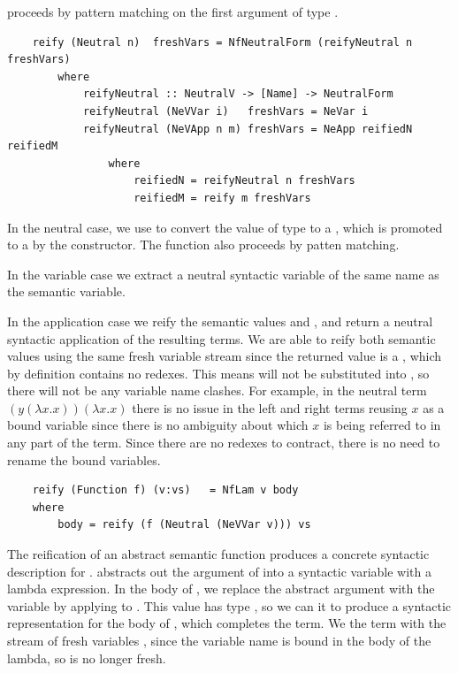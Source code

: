  proceeds by pattern matching on the first argument of type . 

\begin{lstlisting}
    reify (Neutral n)  freshVars = NfNeutralForm (reifyNeutral n freshVars)
        where
            reifyNeutral :: NeutralV -> [Name] -> NeutralForm
            reifyNeutral (NeVVar i)   freshVars = NeVar i
            reifyNeutral (NeVApp n m) freshVars = NeApp reifiedN reifiedM
                where
                    reifiedN = reifyNeutral n freshVars
                    reifiedM = reify m freshVars
\end{lstlisting}

In the neutral case, we use  to convert the value  of type  to a , which is promoted to a  by the  constructor. The  function also proceeds by patten matching. 

In the variable case we extract a neutral syntactic variable of the same name as the semantic variable. 

In the application case we reify the semantic values  and , and return a neutral syntactic application of the resulting terms.
We are able to reify both semantic values using the same fresh variable stream since the returned value is a , which by definition contains no redexes. This means  will not be substituted into , so there will not be any variable name clashes.
For example, in the neutral term $(y(\lambda x.x))(\lambda x . x)$ there is no issue in the left and right terms reusing $x$ as a bound variable since there is no ambiguity about which $x$ is being referred to in any part of the term. Since there are no redexes to contract, there is no need to rename the bound variables.


\begin{lstlisting}
    reify (Function f) (v:vs)   = NfLam v body
    where 
        body = reify (f (Neutral (NeVVar v))) vs
\end{lstlisting}

The reification of an abstract semantic function  produces a concrete syntactic description for .  abstracts out the argument of  into a syntactic variable  with a lambda expression. In the body of , we replace the abstract argument with the variable  by applying  to . This value has type , so we can  it to produce a syntactic representation for the body of , which completes the term. We  the term with the stream of fresh variables , since the variable name  is bound in the body of the lambda, so is no longer fresh.

